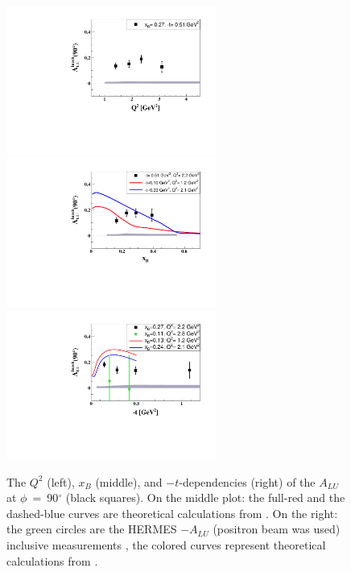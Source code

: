 \documentclass[twocolumn,nofootinbib,showpacs,prl,superscriptaddress,secnumarabic,amssymb,nobibnotes,aps,floatfix]{revtex4}
\begin{document}
\begin{figure}[tb]
\includegraphics[width=6.9cm]{figs/ALU_90_p_vs_Q2_shortscenrario.pdf}
\includegraphics[width=6.9cm]{figs/ALU_90_p_vs_x_shortscenrario.pdf}
\includegraphics[width=6.9cm]{figs/ALU_90_p_vs_t_shortscenrario.pdf}
\caption{The $Q^{2}$ (left), $x_{B}$ (middle), and $-t$-dependencies (right) of
   the $A_{LU}$ at $\phi$~=~90$^{\circ}$ (black squares). On the 
   middle plot: the full-red and the dashed-blue curves are theoretical 
   calculations from \cite{simonetta_2}. On the right: the green circles are 
   the HERMES $-A_{LU}$ (positron beam was used) inclusive measurements 
\cite{Airapetian}, the colored curves represent theoretical calculations from 
\cite{simonetta_2}.}
\label{fig:alu90}
\end{figure}
\end{document}
